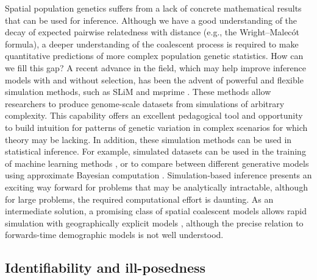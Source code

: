 \documentclass{ar-1col}
\begin{document}
Spatial population genetics suffers from a lack of concrete mathematical results
that can be used for inference.
Although we have a good understanding of the decay of expected pairwise relatedness with distance
(e.g., the Wright--Malec\'{o}t formula),
a deeper understanding of the coalescent process
is required to make quantitative predictions of more complex population genetic statistics.
How can we fill this gap?
A recent advance in the field, 
which may help improve inference models with and without selection, 
has been the advent of powerful and flexible simulation methods, 
such as SLiM \citep{haller2018forward,haller2019treesequence} and msprime \citep{kelleher2016msprime}.
These methods allow
researchers to produce genome-scale datasets from simulations of arbitrary complexity.
This capability offers an excellent pedagogical tool 
and opportunity to build intuition for patterns of genetic variation 
in complex scenarios for which theory may be lacking.
In addition, these simulation methods can be used in statistical inference.
For example, simulated datasets can be used in the training 
of machine learning methods \citep[e.g.,][]{SchriderKern2018}, 
or to compare between different generative models using 
approximate Bayesian computation \citep{MarjoramTavare2006modern}.
Simulation-based inference presents an exciting way forward 
for problems that may be analytically intractable,
although for large problems, the required computational effort is daunting.
As an intermediate solution,
a promising class of spatial coalescent models allows rapid simulation with geographically explicit models
\citep{barton2010newmodel,guindon2016demographic},
although the precise relation to forwards-time demographic models is not well understood.


\subsection{Identifiability and ill-posedness}
\end{document}
